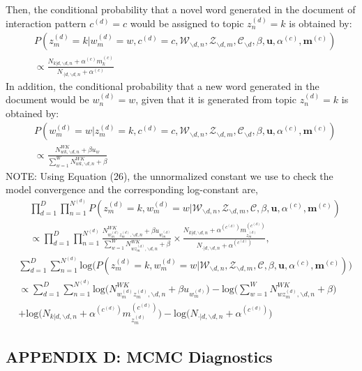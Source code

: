 \documentclass[a4paper]{article}
\begin{document}
  Then, the conditional probability that a novel word generated in the document of interaction pattern $c^{(d)}=c$  would be assigned to topic $z_n^{(d)}=k$ is obtained by:
  \begin{equation}
  \begin{aligned}
  &P(z^{(d)}_m=k|w^{(d)}_m=w, c^{(d)}=c, \mathcal{W}_{\backslash d, n}, \mathcal{Z}_{\backslash d,m}, \mathcal{C}_{\backslash d}, \beta, \boldsymbol{u}, \alpha^{(c)}, \boldsymbol{m}^{(c)}) \\& \propto
  \frac{N_{k|d, \backslash d, n}+\alpha^{(c)} m^{(c)}_k}{N_{\cdot|d, \backslash d, n}+\alpha^{(c)}}
  \end{aligned}
  \end{equation}
  In addition, the conditional probability that a new word generated in the document would be $w_n^{(d)}=w$, given that it is generated from topic $z_n^{(d)}=k$ is obtained by:
  \begin{equation}
  \begin{aligned}
  & P(w^{(d)}_m=w|z^{(d)}_m=k, c^{(d)}=c, \mathcal{W}_{\backslash d, n}, \mathcal{Z}_{\backslash d,m}, \mathcal{C}_{\backslash d}, \beta, \boldsymbol{u}, \alpha^{(c)}, \boldsymbol{m}^{(c)}) \\& \propto 
  \frac{N_{wk, \backslash d, n}^{WK}+\beta u_w}{\sum_{w=1}^WN_{wk, \backslash d, n}^{WK}+\beta}
  \end{aligned} 
  \end{equation}
  NOTE: Using Equation (26), the unnormalized constant we use to check the model convergence and the corresponding log-constant are,
  \begin{equation}
  \begin{aligned}
  & \prod_{d=1}^{D}\prod_{n=1}^{N^{(d)}}  P(z^{(d)}_m=k, w^{(d)}_m=w|\mathcal{W}_{\backslash d, n}, \mathcal{Z}_{\backslash d,m}, \mathcal{C}, \beta, \boldsymbol{u}, \alpha^{(c)}, \boldsymbol{m}^{(c)}) \\ & \propto \prod_{d=1}^{D}\prod_{n=1}^{N^{(d)}} 
  \frac{N_{w^{(d)}_mz^{(d)}_m, \backslash d, n}^{WK}+\beta u_ {w^{(d)}_m}}{\sum_{w=1}^WN_{wz^{(d)}_m,  \backslash d, n}^{WK}+\beta}\times\frac{N_{k|d, \backslash d, n}+\alpha^{(c^{(d)})} m^{(c^{(d)})}_{z^{(d)}_m}}{N_{\cdot|d, \backslash d, n}+\alpha^{(c^{(d)})}},
  \end{aligned}
  \end{equation}
  \begin{equation}
  \begin{aligned}
  & \sum_{d=1}^{D}\sum_{n=1}^{N^{(d)}} \mbox{log}\Big( P(z^{(d)}_m=k, w^{(d)}_m=w|\mathcal{W}_{\backslash d, n}, \mathcal{Z}_{\backslash d,m}, \mathcal{C}, \beta, \boldsymbol{u}, \alpha^{(c)}, \boldsymbol{m}^{(c)})\Big) \\ & \propto \sum_{d=1}^{D}\sum_{n=1}^{N^{(d)}} 
  \mbox{log}\Big(N_{w^{(d)}_mz^{(d)}_m, \backslash d, n}^{WK}+\beta u_ {w^{(d)}_m}\Big)-\mbox{log}\Big(\sum_{w=1}^WN_{wz^{(d)}_m,  \backslash d, n}^{WK}+\beta\Big)\\&+\mbox{log}\Big(N_{k|d, \backslash d, n}+\alpha^{(c^{(d)})} m^{(c^{(d)})}_{z^{(d)}_m}\Big)-\mbox{log}\Big(N_{\cdot|d, \backslash d, n}+\alpha^{(c^{(d)})}\Big)
  \end{aligned}
  \end{equation}
  \subsection*{APPENDIX D: MCMC Diagnostics}
  
  	\clearpage


\end{document}
